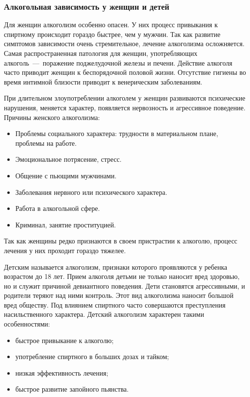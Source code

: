 \documentclass[14pt]{extarticle}
\begin{document}
\subsubsection*{Алкогольная зависимость у женщин и детей}

Для женщин алкоголизм особенно опасен. У них процесс привыкания к спиртному происходит гораздо быстрее, чем у мужчин. Так как развитие симптомов зависимости очень стремительное, лечение алкоголизма осложняется. Самая распространенная патология для женщин, употребляющих алкоголь~---~поражение поджелудочной железы и печени. Действие алкоголя часто приводит женщин к беспорядочной половой жизни. Отсутствие гигиены во время интимной близости приводит к венерическим заболеваниям.

При длительном злоупотреблении алкоголем у женщин развиваются психические нарушения, меняется характер, появляется нервозность и агрессивное поведение. Причины женского алкоголизма:

\begin{itemize}
	\item Проблемы социального характера: трудности в материальном плане, проблемы на работе.
	\item Эмоциональное потрясение, стресс.
	\item Общение с пьющими мужчинами.
	\item Заболевания нервного или психического характера.
	\item Работа в алкогольной сфере.
	\item Криминал, занятие проституцией.
\end{itemize}
	
Так как женщины редко признаются в своем пристрастии к алкоголю, процесс лечения у них проходит гораздо тяжелее.

Детским называется алкоголизм, признаки которого проявляются у ребенка возрастом до 18 лет. Прием алкоголя детьми не только наносит вред здоровью, но и служит причиной девиантного поведения. Дети становятся агрессивными, и родители теряют над ними контроль. Этот вид алкоголизма наносит большой вред обществу. Под влиянием спиртного часто совершаются преступления насильственного характера. Детский алкоголизм характерен такими особенностями:

\begin{itemize}
	\item быстрое привыкание к алкоголю;
	\item употребление спиртного в больших дозах и тайком;
	\item низкая эффективность лечения;
	\item быстрое развитие запойного пьянства.
\end{itemize}
	
\end{document}
